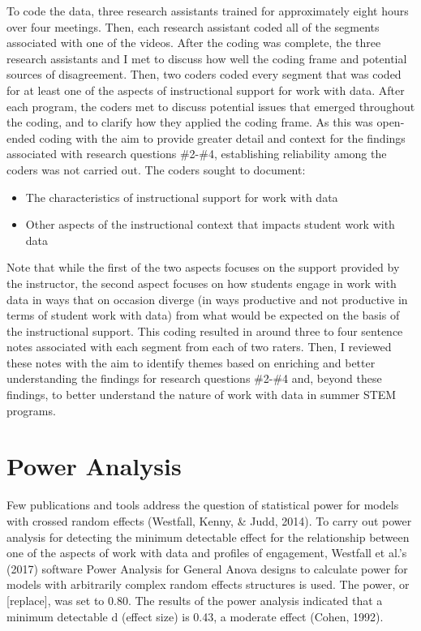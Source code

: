 \documentclass[]{book}
\providecommand{\tightlist}{%
  \setlength{\itemsep}{0pt}\setlength{\parskip}{0pt}}
\theoremstyle{definition}
\theoremstyle{definition}
\theoremstyle{definition}
\theoremstyle{remark}
\begin{document}
To code the data, three research assistants trained for approximately
eight hours over four meetings. Then, each research assistant coded all
of the segments associated with one of the videos. After the coding was
complete, the three research assistants and I met to discuss how well
the coding frame and potential sources of disagreement. Then, two coders
coded every segment that was coded for at least one of the aspects of
instructional support for work with data. After each program, the coders
met to discuss potential issues that emerged throughout the coding, and
to clarify how they applied the coding frame. As this was open-ended
coding with the aim to provide greater detail and context for the
findings associated with research questions \#2-\#4, establishing
reliability among the coders was not carried out. The coders sought to
document:

\begin{itemize}
\tightlist
\item
  The characteristics of instructional support for work with data
\item
  Other aspects of the instructional context that impacts student work
  with data
\end{itemize}

Note that while the first of the two aspects focuses on the support
provided by the instructor, the second aspect focuses on how students
engage in work with data in ways that on occasion diverge (in ways
productive and not productive in terms of student work with data) from
what would be expected on the basis of the instructional support. This
coding resulted in around three to four sentence notes associated with
each segment from each of two raters. Then, I reviewed these notes with
the aim to identify themes based on enriching and better understanding
the findings for research questions \#2-\#4 and, beyond these findings,
to better understand the nature of work with data in summer STEM
programs.

\section{Power Analysis}\label{power-analysis}

Few publications and tools address the question of statistical power for
models with crossed random effects (Westfall, Kenny, \& Judd, 2014). To
carry out power analysis for detecting the minimum detectable effect for
the relationship between one of the aspects of work with data and
profiles of engagement, Westfall et al.'s (2017) software Power Analysis
for General Anova designs to calculate power for models with arbitrarily
complex random effects structures is used. The power, or {[}replace{]},
was set to 0.80. The results of the power analysis indicated that a
minimum detectable d (effect size) is 0.43, a moderate effect (Cohen,
1992).
\end{document}
